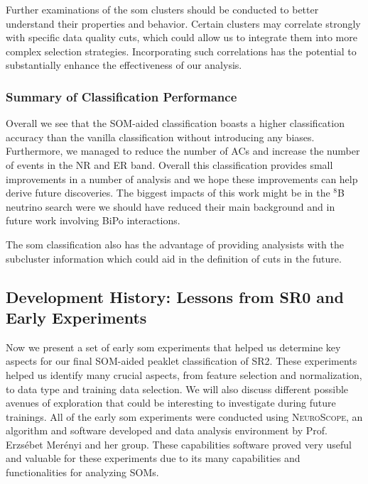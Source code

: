 Further examinations of the \acrshort{som} clusters should be conducted to better understand their properties and behavior. Certain clusters may correlate strongly with specific data quality cuts, which could allow us to integrate them into more complex selection strategies. Incorporating such correlations has the potential to substantially enhance the effectiveness of our analysis.

\subsubsection{Summary of Classification Performance}

Overall we see that the SOM-aided classification boasts a higher classification accuracy than the vanilla classification without introducing any biases. Furthermore, we managed to reduce the number of ACs and increase the number of events in the NR and ER band. Overall this classification provides small improvements in a number of analysis and we hope these improvements can help derive future discoveries. The biggest impacts of this work might be in the $^{8}$B neutrino search were we should have reduced their main background and in future work involving BiPo interactions.

The \acrshort{som} classification also has the advantage of providing analysists with the subcluster information which could aid in the definition of cuts in the future.



\subsection{Development History: Lessons from SR0 and Early Experiments}

Now we present a set of early \acrshort{som} experiments that helped us determine key aspects for our final SOM-aided peaklet classification of SR2. These experiments helped us identify many crucial aspects, from feature selection and normalization, to data type and training data selection. We will also discuss different possible avenues of exploration that could be interesting to investigate during future trainings. All of the early \acrshort{som} experiments were conducted using \textsc{NeuroScope}, an algorithm and software developed and data analysis environment by Prof. Erzs\'ebet Mer\'enyi and her group. These capabilities software proved very useful and valuable for these experiments due to its many capabilities and functionalities for analyzing SOMs.



